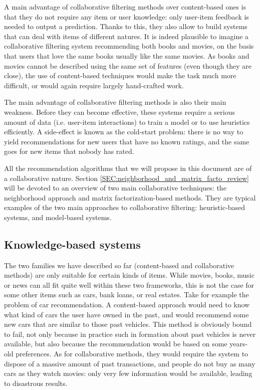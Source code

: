 A main advantage of collaborative filtering methods over content-based ones is
that they do not require any item or user knowledge: only user-item feedback is
needed to output a prediction. Thanks to this, they also allow to build systems
that can deal with items of different natures. It is indeed plausible to
imagine a collaborative filtering system recommending both books and movies, on
the basis that users that love the same books usually like the same movies. As
books and movies cannot be described using the same set of features (even
though they are close), the use of content-based techniques would make the task
much more difficult, or would again require largely hand-crafted work.

The main advantage of collaborative filtering methods is also their main
weakness. Before they can become effective, these systems require a serious
amount of data (i.e. user-item interactions) to train a model or to use
heuristics efficiently. A side-effect is known as the cold-start problem: there
is no way to yield recommendations for new users that have no known ratings,
and the same goes for new items that nobody has rated.

All the recommendation algorithms that we will propose in this document are of
a collaborative nature. Section \ref{SEC:neighborhood_and_matrix_facto_review}
will be devoted to an overview of two main collaborative techniques: the
neighborhood approach and matrix factorization-based methods. They are
typical examples of the two main approaches to collaborative filtering:
heuristic-based systems, and model-based systems.

\subsection{Knowledge-based systems}

The two families we have described so far (content-based and collaborative
methods) are only suitable for certain kinds of items. While movies, books,
music or news can all fit quite well within these two frameworks, this is not
the case for some other items such as cars, bank loans, or real estates. Take
for example the problem of car recommendation. A content-based approach would
need to know what kind of cars the user have owned in the past, and would
recommend some new cars that are similar to those past vehicles. This method is
obviously bound to fail, not only because in practice such in formation about
past vehicles is never available, but also because the recommendation would be
based on some years-old preferences. As for collaborative methods, they would
require the system to dispose of a massive amount of past transactions, and
people do not buy as many cars as they watch movies: only very few information
would be available, leading to disastrous results.

